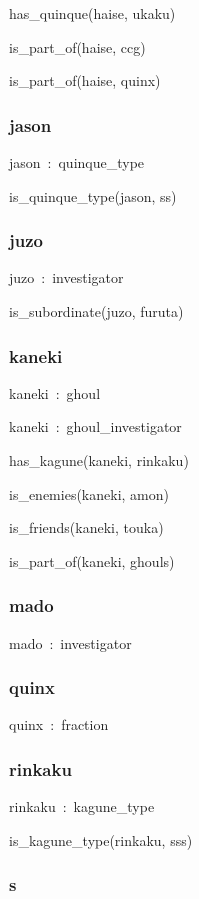 \documentclass{article}
\begin{document}
has\_quinque(haise, ukaku)

is\_part\_of(haise, ccg)

is\_part\_of(haise, quinx)

\subsubsection*{jason}

jason~:~quinque\_type

is\_quinque\_type(jason, ss)

\subsubsection*{juzo}

juzo~:~investigator

is\_subordinate(juzo, furuta)

\subsubsection*{kaneki}

kaneki~:~ghoul

kaneki~:~ghoul\_investigator

has\_kagune(kaneki, rinkaku)

is\_enemies(kaneki, amon)

is\_friends(kaneki, touka)

is\_part\_of(kaneki, ghouls)

\subsubsection*{mado}

mado~:~investigator

\subsubsection*{quinx}

quinx~:~fraction

\subsubsection*{rinkaku}

rinkaku~:~kagune\_type

is\_kagune\_type(rinkaku, sss)

\subsubsection*{s}
\end{document}
